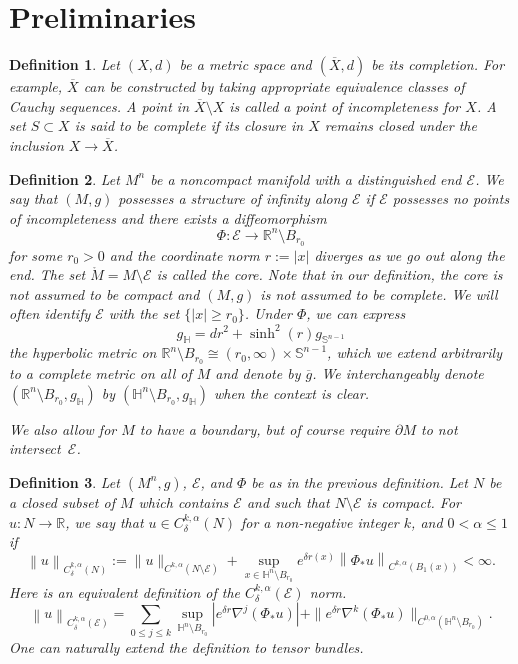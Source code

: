 \documentclass[11pt]{amsart}
\newtheorem{defn}{Definition}[section]
\theoremstyle{remark}
\numberwithin{equation}{section}
\def\R{\mathbb{R}}
\def\d{\frac {\operatorname d}{\operatorname {dt}}}
\def\d{\delta}
\def\mE{\mathcal{E}}
\def\mE{\mathcal{E}}
\def\HH{\mathbb{H}}
\def\gH{g_{\HH}}
\def\mS{\mathbb{S}}
\begin{document}
{{\section{Preliminaries}\label{Preliminaries}
\begin{defn}\label{incomplete}
	Let $(X,d)$ be a metric space and $(\overline X,d)$ be its completion. For example, $\overline X$ can be constructed by taking appropriate equivalence classes of Cauchy sequences. A point in $\overline X\setminus X$ is called a \emph{point of incompleteness} for $X$. A set $S\subset X$ is said to be \emph{complete} if its closure in $X$ remains closed under the inclusion $X\to\overline X$.   
\end{defn}

\begin{defn}\label{strinfty}
Let $M^n$ be a noncompact manifold with a distinguished end $\mathcal E$. We say that $(M,g)$ possesses a \emph{structure of infinity} along $\mathcal E$ if $\mathcal E$ possesses no points of incompleteness and there exists a diffeomorphism 
\begin{equation}\Phi:\mathcal E\to \R^n\setminus B_{r_0}\end{equation} for some $r_0>0$
and the coordinate norm $r:=|x|$ diverges as we go out along the end. The set $\mathring M=M\setminus \mathcal E$ is called the \emph{core}. Note that in our definition, the core is not assumed to be compact and $(M,g)$ is not assumed to be complete. We will often identify $\mathcal E$ with the set $\{|x| \ge r_0\}$. Under $\Phi$, we can express
\begin{equation*}
    \gH = dr^2 + \sinh^2(r) g_{\mS^{n-1}}
\end{equation*}
the hyperbolic metric on $\R^n \setminus B_{r_0} \cong (r_0,\infty) \times \mS^{n-1}$,  which we extend arbitrarily to a complete metric on all of $M$ and denote by $\overline g$. We interchangeably denote $(\R^n\setminus B_{r_0}, \gH)$ by $(\HH^n\setminus B_{r_0}, \gH)$ when the context is clear. 


We also allow for $M$ to have a boundary, but of course require $\partial M$ to not intersect~$\mathcal E$.
\end{defn}

\begin{defn}\label{weighted holder space} Let $(M^n, g)$, $\mathcal E$, and $\Phi$ be as in the previous definition.  Let $N$ be a closed subset of $M$ which contains $\mathcal E$ and such that $N\setminus \mathcal E$ is compact.
For $u:N\to \R$, we say that 
$u \in C_\delta^{k,\alpha}(N)$ for a non-negative integer $k$, and $0< \alpha \leq1$ if
\[
\left\| u \right\|_{C^{k, \alpha}_\delta(N)} 
:= \|u\|_{C^{k,\alpha}(N\setminus \mathcal E)}+\sup_{x \in \HH^n\setminus B_{r_0}} e^{\d r(x)} 
\left\| \Phi_* u \right\|_{C^{k, \alpha}(B_1(x))} < \infty.
\]
Here is an equivalent definition of the
$C^{k, \alpha}_\delta(\mE)$ norm. 
\[
\left\|u \right\|_{C^{k, \alpha}_\delta(\mE)} 
= \sum_{0\leq j \leq k} \sup_{\HH^n \setminus B_{r_0}} |e^{\delta r} \nabla^j (\Phi_* u)| 
+ \|e^{\delta r} \nabla^k(\Phi_* u)\|_{C^{0,\alpha}(\HH^n \setminus B_{r_0})}.
\] 
One can naturally extend the definition to tensor bundles. 
\end{defn}

}}
\end{document}
